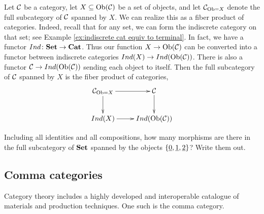 \begin{example}

Let $\mathcal{C}$ be a category, let $X\subseteq\textnormal{Ob}(\mathcal{C})$ be a set of objects, and let $\mathcal{C}_{\textnormal{Ob}=X}$ denote the full subcategory of $\mathcal{C}$ spanned by $X$. We can realize this as a fiber product of categories. Indeed, recall that for any set, we can form the indiscrete category on that set; see Example \ref{ex:indiscrete cat equiv to terminal}. In fact, we have a functor $Ind\colon{\bf Set}\rightarrow{\bf Cat}$. Thus our function $X\rightarrow\textnormal{Ob}(\mathcal{C})$ can be converted into a functor between indiscrete categories $Ind(X)\rightarrow Ind(\textnormal{Ob}(\mathcal{C}))$. There is also a functor $\mathcal{C}\rightarrow Ind(\textnormal{Ob}(\mathcal{C}))$ sending each object to itself. Then the full subcategory of $\mathcal{C}$ spanned by $X$ is the fiber product of categories,
$$\xymatrix{\mcC_{\Ob=X}\ar[r]\ar[d]&\mcC\ar[d]\\Ind(X)\ar[r]&Ind(\Ob(\mcC))}$$

\end{example}

\begin{exercise}
Including all identities and all compositions, how many morphisms are there in the full subcategory of ${\bf Set}$ spanned by the objects $\{\underline{0},\underline{1},\underline{2}\}$? Write them out.
\end{exercise}


\subsection{Comma categories}\label{sec:comma}

Category theory includes a highly developed and interoperable catalogue of materials and production techniques. One such is the comma category.

